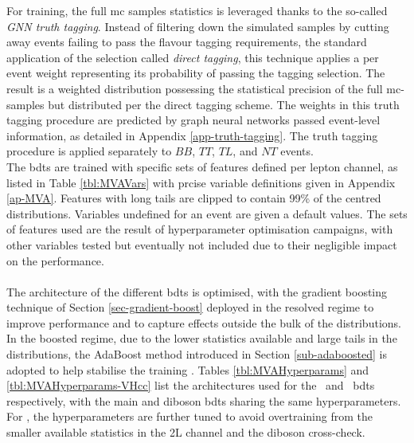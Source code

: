 For training, the full \gls{mc} samples statistics is leveraged thanks to the so-called \textit{GNN truth tagging}. Instead of filtering down the simulated samples by cutting away events failing to pass the flavour tagging requirements, the standard application of the selection called \textit{direct tagging}, this technique applies a per event weight representing its probability of passing the tagging selection. The result is a weighted distribution possessing the statistical precision of the full \gls{mc}-samples but distributed per the direct tagging scheme. The weights in this truth tagging procedure are predicted by graph neural networks passed event-level information, as detailed in Appendix \ref{app-truth-tagging}. The truth tagging procedure is applied separately to $BB$, $TT$, $TL$, and $NT$ events. \\

The \glspl{bdt} are trained with specific sets of features defined per lepton channel, as listed in Table \ref{tbl:MVAVars} with prcise variable definitions given in Appendix \ref{ap-MVA}. Features with long tails are clipped to contain 99\% of the centred distributions. Variables undefined for an event are given a default values. The sets of features used are the result of hyperparameter optimisation campaigns, with other variables tested but eventually not included due to their negligible impact on the performance. 



\paragraph{}The architecture of the different \glspl{bdt} is optimised, with the gradient boosting technique of Section \ref{sec-gradient-boost} deployed in the resolved regime to improve performance and to capture effects outside the bulk of the distributions. In the boosted regime, due to the lower statistics available and large tails in the distributions, the AdaBoost method introduced in Section \ref{sub-adaboosted} is adopted to help stabilise the training \cite{Adaboost}. Tables \ref{tbl:MVAHyperparams} and \ref{tbl:MVAHyperparams-VHcc} list the architectures used for the \vhb\ and \vhc\ \glspl{bdt} respectively, with the main and diboson \glspl{bdt} sharing the same hyperparameters. For \vhc, the hyperparameters are further tuned to avoid overtraining from the smaller available statistics in the 2L channel and the diboson cross-check.



